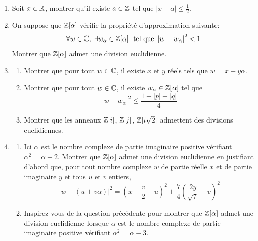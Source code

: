 \begin{enumerate}
  \item Soit $x\in \mathbb{R}$, montrer qu'il existe $a\in \mathbb{Z}$ tel que $|x-a|\leq \frac{1}{2}$.
  \item On suppose que $\mathbb{Z}[\alpha]$ vérifie la propriété d'approximation suivante:
  \begin{displaymath}
    \forall w \in \mathbb{C}, \; \exists w_{\alpha} \in \mathbb{Z}[\alpha]\;\text{ tel que } \left| w - w_{\alpha}\right|^2 < 1
  \end{displaymath}
  Montrer que $\mathbb{Z}[\alpha]$ admet une division euclidienne.
  \item 
  \begin{enumerate}
    \item Montrer que pour tout $w\in \mathbb{C}$, il existe $x$ et $y$ réels tels que $w = x + y\alpha$.
    \item Montrer que pour tout $w\in \mathbb{C}$, il existe $w_{\alpha}\in \mathbb{Z}[\alpha]$ tel que 
    \begin{displaymath}
      |w-w_{\alpha}|^2 \leq \frac{1 + |p| + |q|}{4} 
    \end{displaymath}
    \item Montrer que les anneaux $\mathbb{Z}[i]$, $\mathbb{Z}[j]$, $\mathbb{Z}[i\sqrt{2}]$ admettent des divisions euclidiennes.
  \end{enumerate}
  \item 
  \begin{enumerate}
    \item Ici $\alpha$ est le nombre complexe de partie imaginaire positive vérifiant $\alpha^2 = \alpha - 2$.\newline
  Montrer que $\mathbb{Z}[\alpha]$ admet une division euclidienne en justifiant d'abord que, pour tout nombre complexe $w$ de partie réelle $x$ et de partie imaginaire $y$ et tous $u$ et $v$ entiers, 
\begin{displaymath}
  \left| w -(u+v\alpha)\right|^2
  = \left( x-\frac{v}{2}- u\right)^2 + \frac{7}{4}\left( \frac{2y}{\sqrt{7}}- v\right)^2  
\end{displaymath}
    \item Inspirez vous de la question précédente pour montrer que $\mathbb{Z}[\alpha]$ admet une division euclidienne lorsque $\alpha$ est le nombre complexe de partie imaginaire positive vérifiant $\alpha^2 = \alpha - 3$.
  \end{enumerate}
\end{enumerate}


